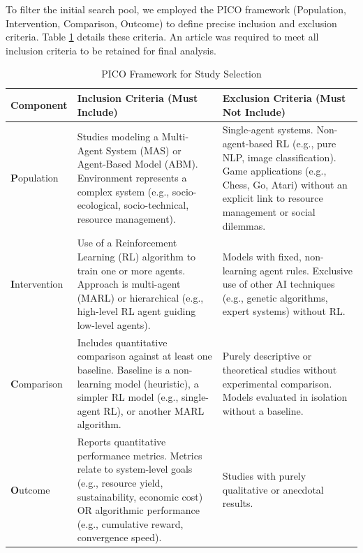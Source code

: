\documentclass[conference]{IEEEtran}
\begin{document}
To filter the initial search pool, we employed the PICO framework (Population, Intervention, Comparison, Outcome) to define precise inclusion and exclusion criteria. Table \ref{tab:pico} details these criteria. An article was required to meet all inclusion criteria to be retained for final analysis.

\begin{table}[htbp]
\caption{PICO Framework for Study Selection}
\begin{center}
\begin{tabular}{|l|p{7.5cm}|p{7.5cm}|}
\hline
\textbf{Component} & \textbf{Inclusion Criteria (Must Include)} & \textbf{Exclusion Criteria (Must Not Include)} \\
\hline
\textbf{P}opulation & 
Studies modeling a Multi-Agent System (MAS) or Agent-Based Model (ABM). \newline
Environment represents a complex system (e.g., socio-ecological, socio-technical, resource management).
& 
Single-agent systems. \newline
Non-agent-based RL (e.g., pure NLP, image classification). \newline
Game applications (e.g., Chess, Go, Atari) without an explicit link to resource management or social dilemmas.
\\
\hline
\textbf{I}ntervention & 
Use of a Reinforcement Learning (RL) algorithm to train one or more agents. \newline
Approach is multi-agent (MARL) or hierarchical (e.g., high-level RL agent guiding low-level agents).
& 
Models with fixed, non-learning agent rules. \newline
Exclusive use of other AI techniques (e.g., genetic algorithms, expert systems) without RL.
\\
\hline
\textbf{C}omparison & 
Includes quantitative comparison against at least one baseline. \newline
Baseline is a non-learning model (heuristic), a simpler RL model (e.g., single-agent RL), or another MARL algorithm.
& 
Purely descriptive or theoretical studies without experimental comparison. \newline
Models evaluated in isolation without a baseline.
\\
\hline
\textbf{O}utcome & 
Reports quantitative performance metrics. \newline
Metrics relate to system-level goals (e.g., resource yield, sustainability, economic cost) OR algorithmic performance (e.g., cumulative reward, convergence speed).
& 
Studies with purely qualitative or anecdotal results.
\\
\hline
\end{tabular}
\label{tab:pico}
\end{center}
\end{table}
\end{document}
